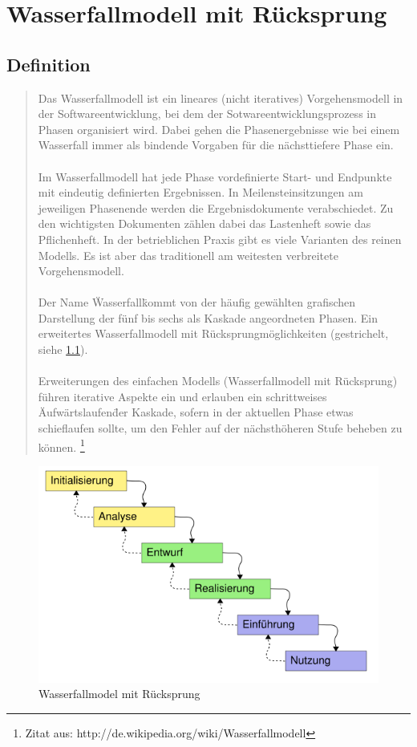\chapter{Wasserfallmodell mit Rücksprung}
\section{Definition}
\begin{quote}
Das Wasserfallmodell ist ein lineares (nicht iteratives) Vorgehensmodell in der Softwareentwicklung, bei dem der
 Sotwareentwicklungsprozess in Phasen organisiert wird. Dabei gehen die Phasenergebnisse wie bei einem Wasserfall immer
als bindende Vorgaben für die nächsttiefere Phase ein.\ \\ \\
Im Wasserfallmodell hat jede Phase vordefinierte Start- und Endpunkte mit eindeutig definierten Ergebnissen.
In Meilensteinsitzungen am jeweiligen Phasenende werden die Ergebnisdokumente verabschiedet. Zu den wichtigsten
Dokumenten zählen dabei das Lastenheft sowie das Pflichenheft. In der betrieblichen Praxis gibt es viele Varianten
des reinen Modells. Es ist aber das traditionell am weitesten verbreitete Vorgehensmodell.\ \\ \\
Der Name \"Wasserfall\" kommt von der häufig gewählten grafischen Darstellung der fünf bis sechs als Kaskade
angeordneten Phasen. Ein erweitertes Wasserfallmodell mit Rücksprungmöglichkeiten (gestrichelt, siehe \ref{w_model}).\ \\ \\
Erweiterungen des einfachen Modells (Wasserfallmodell mit Rücksprung) führen iterative Aspekte ein und erlauben
ein schrittweises \"Aufwärtslaufen\" der Kaskade, sofern in der aktuellen Phase etwas schieflaufen sollte,
um den Fehler auf der nächsthöheren Stufe beheben zu können.
\footnote{Zitat aus:  http://de.wikipedia.org/wiki/Wasserfallmodell}
\end{quote}
\begin{figure}[h]
\centering
\includegraphics[width=\textwidth]{./gfx/misc/567px-Wasserfallmodell.png}
\caption{Wasserfallmodel mit Rücksprung}
\label{w_model}
\end{figure}


